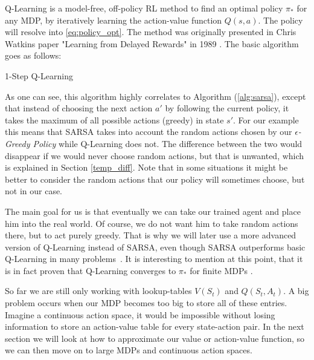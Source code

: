 Q-Learning is a model-free, off-policy RL method to find an optimal policy $\pi_{*}$ for any MDP, by iteratively learning the action-value function $Q(s,a)$.
The policy will resolve into \ref{eq:policy_opt}.
The method was originally presented in Chris Watkins paper "Learning from Delayed Rewards" in 1989 \cite{qlearning}.
The basic algorithm goes as follows:
\begin{algorithm}[H]
  \caption{1-Step Q-Learning}
  \label{alg:qlearning}
  \begin{algorithmic}[1]
		\EndWhile
	\EndFor
  \end{algorithmic}
\end{algorithm}
As one can see, this algorithm highly correlates to Algorithm (\ref{alg:sarsa}), except that instead of choosing the next action $a'$ by following the current policy, it takes the maximum of all possible actions (greedy) in state $s'$.
For our example this means that SARSA takes into account the random actions chosen by our \emph{$\epsilon$-Greedy Policy} while Q-Learning does not.
The difference between the two would disappear if we would never choose random actions, but that is unwanted, which is explained in Section \ref{temp_diff}.
Note that in some situations it might be better to consider the random actions that our policy will sometimes choose, but not in our case.


The main goal for us is that eventually we can take our trained agent and place him into the real world.
Of course, we do not want him to take random actions there, but to act purely greedy.
That is why we will later use a more advanced version of Q-Learning instead of SARSA, even though SARSA outperforms basic Q-Learning in many problems~\cite{sarsa}.
It is interesting to mention at this point, that it is in fact proven that Q-Learning converges to $\pi_{*}$ for finite MDPs \cite{qlearning_proof}.


So far we are still only working with lookup-tables $V(S_t)$ and $Q(S_t, A_t)$.
A big problem occurs when our MDP becomes too big to store all of these entries.
Imagine a continuous action space, it would be impossible without losing information to store an action-value table for every state-action pair.
In the next section we will look at how to approximate our value or action-value function, so we can then move on to large MDPs and continuous action spaces.


